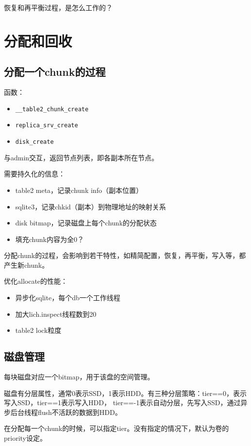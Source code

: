 恢复和再平衡过程，是怎么工作的？

\section{分配和回收}

\subsection{分配一个chunk的过程}

函数：
\begin{itemize}
    \item \verb|__table2_chunk_create|
    \item \verb|replica_srv_create|
    \item \verb|disk_create|
\end{itemize}

与admin交互，返回节点列表，即各副本所在节点。

需要持久化的信息：
\begin{itemize}
    \item table2 meta，记录chunk info（副本位置）
    \item sqlite3，记录chkid（副本）到物理地址的映射关系
    \item disk bitmap，记录磁盘上每个chunk的分配状态
    \item 填充chunk内容为全0？
\end{itemize}

分配chunk的过程，会影响到若干特性，如精简配置，恢复，再平衡，写入等，都产生新chunk。

优化allocate的性能：
\begin{itemize}
    \item 异步化sqlite，每个db一个工作线程
    \item 加大lich.inspect线程数到20
    \item table2 lock粒度 
\end{itemize}

\subsection{磁盘管理}

每块磁盘对应一个bitmap，用于该盘的空间管理。

磁盘有分层属性，通常0表示SSD，1表示HDD。有三种分层策略：tier==0，表示写入SSD，tier==1表示写入HDD，
tier==-1表示自动分层，先写入SSD，通过异步后台线程flush不活跃的数据到HDD。

在分配每一个chunk的时候，可以指定tier。没有指定的情况下，默认为卷的priority设定。

